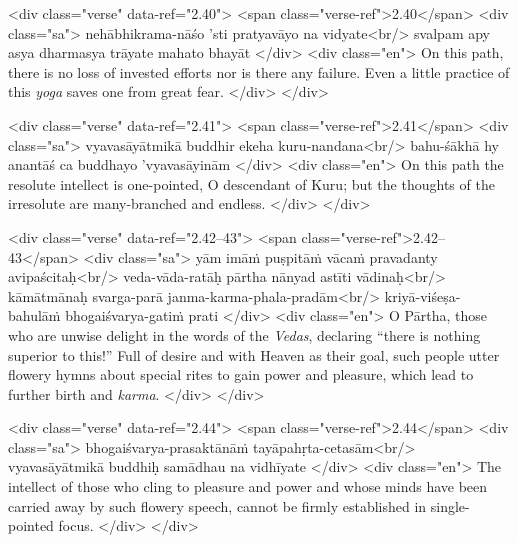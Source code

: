\begin{html}
<div class="verse" data-ref="2.40">
  <span class="verse-ref">2.40</span>
  <div class="sa">
    nehābhikrama-nāśo ’sti pratyavāyo na vidyate<br/>
    svalpam apy asya dharmasya trāyate mahato bhayāt
  </div>
  <div class="en">
    On this path, there is no loss of invested efforts nor is there any failure. Even a little practice of this \textit{yoga} saves one from great fear.
  </div>
</div>
\end{html}



\begin{html}
<div class="verse" data-ref="2.41">
  <span class="verse-ref">2.41</span>
  <div class="sa">
    vyavasāyātmikā buddhir ekeha kuru-nandana<br/>
    bahu-śākhā hy anantāś ca buddhayo ’vyavasāyinām
  </div>
  <div class="en">
    On this path the resolute intellect is one-pointed, O descendant of Kuru; but the thoughts of the irresolute are many-branched and endless.
  </div>
</div>
\end{html}



\begin{html}
<div class="verse" data-ref="2.42–43">
  <span class="verse-ref">2.42–43</span>
  <div class="sa">
    yām imāṁ puṣpitāṁ vācaṁ pravadanty avipaścitaḥ<br/>
    veda-vāda-ratāḥ pārtha nānyad astīti vādinaḥ<br/>
    kāmātmānaḥ svarga-parā janma-karma-phala-pradām<br/>
    kriyā-viśeṣa-bahulāṁ bhogaiśvarya-gatiṁ prati
  </div>
  <div class="en">
    O Pārtha, those who are unwise delight in the words of the \textit{Vedas}, declaring \enquote{there is nothing superior to this!} Full of desire and with Heaven as their goal, such people utter flowery hymns about special rites to gain power and pleasure, which lead to further birth and \textit{karma}.
  </div>
</div>
\end{html}



\begin{html}
<div class="verse" data-ref="2.44">
  <span class="verse-ref">2.44</span>
  <div class="sa">
    bhogaiśvarya-prasaktānāṁ tayāpahṛta-cetasām<br/>
    vyavasāyātmikā buddhiḥ samādhau na vidhīyate
  </div>
  <div class="en">
    The intellect of those who cling to pleasure and power and whose minds have been carried away by such flowery speech, cannot be firmly established in single-pointed focus.
  </div>
</div>
\end{html}


